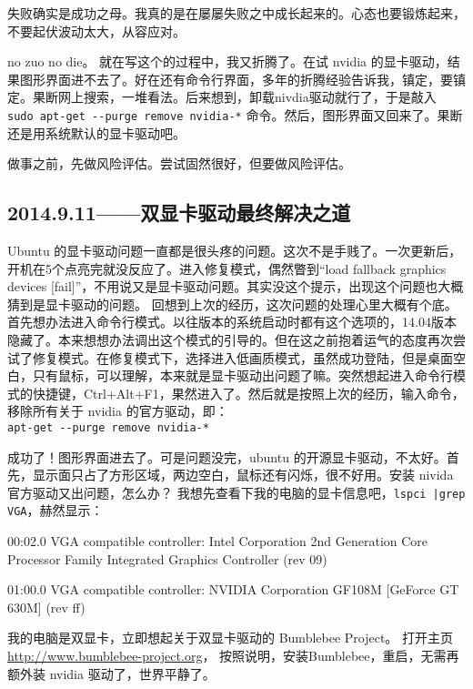 \documentclass[a4paper,11pt,twoside]{book}
\newcommand{\sanhao}{\fontsize{15.75pt}{\baselineskip}\selectfont}
\begin{document}
失败确实是成功之母。我真的是在屡屡失败之中成长起来的。心态也要锻炼起来，不要起伏波动太大，从容应对。

no zuo no die。 就在写这个的过程中，我又折腾了。在试 nvidia 的显卡驱动，结果图形界面进不去了。好在还有命令行界面，多年的折腾经验告诉我，镇定，要镇定。果断网上搜索，一堆看法。后来想到，卸载nivdia驱动就行了，于是敲入 \verb|sudo apt-get --purge remove nvidia-*| 命令。然后，图形界面又回来了。果断还是用系统默认的显卡驱动吧。

做事之前，先做风险评估。尝试固然很好，但要做风险评估。



\subsection*{2014.9.11——双显卡驱动最终解决之道}
Ubuntu 的显卡驱动问题一直都是很头疼的问题。这次不是手贱了。一次更新后，开机在5个点亮完就没反应了。进入修复模式，偶然瞥到“load fallback graphics devices [fail]”，不用说又是显卡驱动问题。其实没这个提示，出现这个问题也大概猜到是显卡驱动的问题。 回想到上次的经历，这次问题的处理心里大概有个底。首先想办法进入命令行模式。以往版本的系统启动时都有这个选项的，14.04版本隐藏了。本来想想办法调出这个模式的引导的。但在这之前抱着运气的态度再次尝试了修复模式。在修复模式下，选择进入低画质模式，虽然成功登陆，但是桌面空白，只有鼠标，可以理解，本来就是显卡驱动出问题了嘛。突然想起进入命令行模式的快捷键，Ctrl+Alt+F1，果然进入了。然后就是按照上次的经历，输入命令，移除所有关于 nvidia 的官方驱动，即：\\
\verb|apt-get --purge remove nvidia-*|

成功了！图形界面进去了。可是问题没完，ubuntu 的开源显卡驱动，不太好。首先，显示面只占了方形区域，两边空白，鼠标还有闪烁，很不好用。安装 nivida 官方驱动又出问题，怎么办？ 我想先查看下我的电脑的显卡信息吧，\verb[lspci |grep VGA[，赫然显示：

00:02.0 VGA compatible controller: Intel Corporation 2nd Generation Core Processor Family Integrated Graphics Controller (rev 09)

01:00.0 VGA compatible controller: NVIDIA Corporation GF108M [GeForce GT 630M] (rev ff)

我的电脑是双显卡，立即想起关于双显卡驱动的 Bumblebee Project。 打开主页 \url{http://www.bumblebee-project.org}， 按照说明，安装Bumblebee，重启，无需再额外装 nvidia 驱动了，世界平静了。
\end{document}
